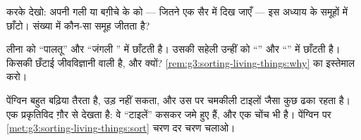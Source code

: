 \begin{exercise}[$\star$]\label{exo:g3:sorting-living-things:8}
करके देखो: अपनी गली या बग़ीचे के  को --- जितने एक सैर में दिख
जाएँ --- इस अध्याय के समूहों में छाँटो। संख्या में कौन-सा समूह जीतता
है?
\end{exercise}

\begin{exercise}[$\star\star$]\label{exo:g3:sorting-living-things:9}
लीना  को ``पालतू'' और ``जंगली '' में छाँटती है। उसकी सहेली
उन्हीं  को ``'' और ``'' में छाँटती है। किसकी छँटाई
जीवविज्ञानी वाली है, और क्यों?
\cref{rem:g3:sorting-living-things:why} का इस्तेमाल करो।
\end{exercise}

\begin{exercise}[$\star\star$]\label{exo:g3:sorting-living-things:10}
पेंग्विन बहुत बढ़िया तैरता है, उड़ नहीं सकता, और उस पर चमकीली टाइलों
जैसा कुछ ढका रहता है। एक प्रकृतिविद ग़ौर से देखता है: वे ``टाइलें''
कसकर जमे हुए  हैं, और एक चोंच भी है। पेंग्विन पर
\cref{met:g3:sorting-living-things:sort} चरण दर चरण चलाओ।
\end{exercise}
